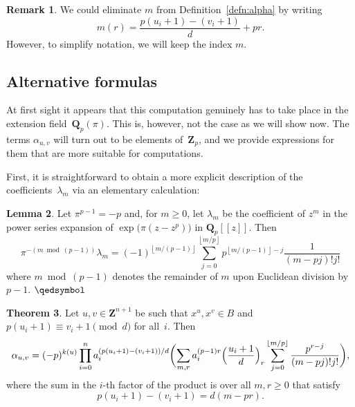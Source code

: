 \documentclass[a4paper,11pt]{article}
\numberwithin{equation}{section}
\providecommand{\floor}[1]{\left\lfloor#1\right\rfloor}   %
\newcommand{\ZZ}{\mathbf{Z}} %
\newcommand{\QQ}{\mathbf{Q}} %
\theoremstyle{definition}
\newtheorem{thm}{Theorem}[section]
\newtheorem{lem}[thm]{Lemma}
\newtheorem{rem}[thm]{Remark}
\begin{document}
\begin{rem}
We could eliminate $m$ from Definition~\ref{defn:alpha} by writing 
\[
m(r)=\frac{p(u_i+1) - (v_i+1)}{d}+pr.
\]
However, to simplify notation, we will keep the index $m$.
\end{rem}

\subsection{Alternative formulas}

At first sight it appears that this computation genuinely has to 
take place in the extension field~$\QQ_p(\pi)$.  This is, however, 
not the case as we will show now.  The terms $\alpha_{u,v}$ 
will turn out to be elements of~$\ZZ_p$, and we provide expressions 
for them that are more suitable for computations.

First, it is straightforward to obtain a more explicit description 
of the coefficients~$\lambda_m$ via an elementary calculation:

\begin{lem} \label{lem:lambdam}
Let $\pi^{p-1} = -p$ and, for $m \geq 0$, let $\lambda_m$ 
be the coefficient of $z^m$ in the power series expansion 
of $\exp \bigl( \pi (z - z^p) \bigr)$ in $\QQ_p[[z]]$.  Then 
\begin{equation*}
\pi^{- (m \bmod{(p-1)})} \lambda_m = (-1)^{\floor{m/(p-1)}} \sum_{j=0}^{\floor{m/p}} p^{\floor{m/(p-1)} - j} \frac{1}{(m-pj)! j!}
\end{equation*}
where $m \bmod{(p-1)}$ denotes the remainder of $m$ upon Euclidean 
division by $p-1$. \hfill $\qedsymbol$
\end{lem}

\begin{thm} \label{thm:alpha}
Let $u, v \in \ZZ^{n+1}$ be such that 
$x^u, x^v \in B$ and 
$p (u_i + 1) \equiv v_i + 1 \pmod{d}$ for all~$i$. 
Then 
\begin{equation*}
\alpha_{u,v} = (-p)^{k(u)} \prod_{i=0}^n a_i^{(p (u_i + 1) - (v_i + 1))/d} 
    \biggl( \sum_{m,r} a_i^{(p-1)r} \Bigl( \frac{u_i+1}{d} \Bigr)_r 
        \sum_{j=0}^{\floor{m/p}} \frac{p^{r-j}}{(m-pj)!j!} \biggr),
\end{equation*}
where the sum in the $i$-th factor of the product is over all $m, r \geq 0$  
that satisfy
\[
p(u_i+1)-(v_i+1)=d(m-pr).
\]
\end{thm}
\end{document}
